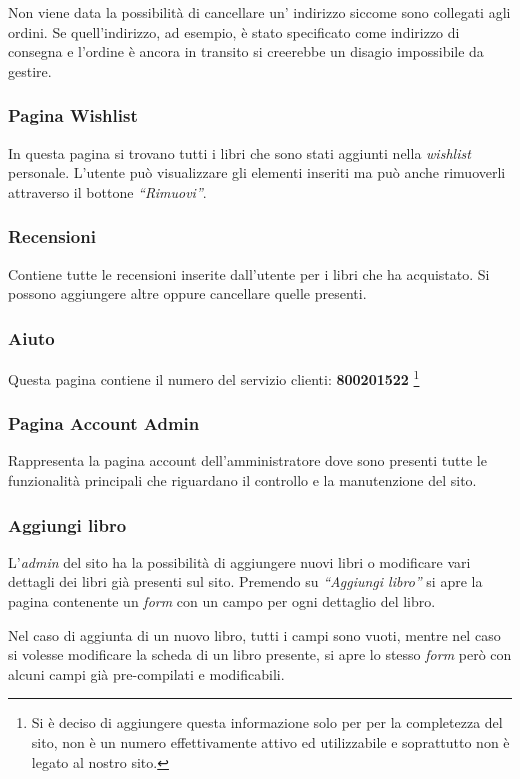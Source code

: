 Non viene data la possibilità di cancellare un’ indirizzo siccome sono collegati agli ordini. Se quell'indirizzo, ad esempio, è stato specificato come indirizzo di consegna e l’ordine è ancora in transito si creerebbe un disagio impossibile da gestire.

\subsubsection{Pagina Wishlist}
In questa pagina si trovano tutti i libri che sono stati aggiunti nella \textit{wishlist} personale. L’utente può visualizzare gli elementi inseriti ma può anche rimuoverli attraverso il bottone \textit{“Rimuovi”}.

\subsubsection{Recensioni}
Contiene tutte le recensioni inserite dall’utente per i libri che ha acquistato. Si possono aggiungere altre oppure cancellare quelle presenti.

\subsubsection{Aiuto}
Questa pagina contiene il numero del servizio clienti: \textbf{800201522} \footnote{Si è deciso di aggiungere questa informazione solo per per la completezza del sito, non è un numero effettivamente attivo ed utilizzabile e soprattutto non è legato al nostro sito.}

\subsubsection{Pagina Account Admin}
Rappresenta la pagina account dell’amministratore dove sono presenti tutte le funzionalità principali che riguardano il controllo e la manutenzione del sito.


\subsubsection{Aggiungi libro}
L’\textit{admin} del sito ha la possibilità di aggiungere nuovi libri o modificare vari dettagli dei libri già presenti sul sito. Premendo su \textit{“Aggiungi libro”} si apre la pagina contenente un \textit{form} con un campo per ogni dettaglio del libro. 

Nel caso di aggiunta di un nuovo libro, tutti i campi sono vuoti, mentre nel caso si volesse modificare la scheda di un libro presente, si apre lo stesso \textit{form} però con alcuni campi già pre-compilati e modificabili. 

